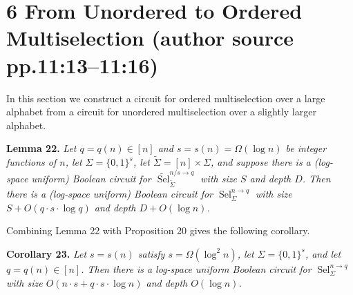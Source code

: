 \documentclass[10pt,a4paper]{article}
\newcommand{\Sel}{\operatorname{Sel}}
\newcommand{\uSel}{\widetilde{\operatorname{Sel}}}
\newcommand{\bits}{\{0,1\}}
\newenvironment{originalresult}[1]{\par\medskip\noindent\textbf{#1.}\itshape}{\par\medskip}
\begin{document}
\section*{6 From Unordered to Ordered Multiselection (author source pp.11:13--11:16)}
In this section we construct a circuit for ordered multiselection over a large alphabet from a circuit for unordered multiselection over a slightly larger alphabet.
\begin{originalresult}{Lemma 22}
Let $q=q(n)\in[n]$ and $s=s(n)=\Omega(\log n)$ be integer functions of $n$, let $\Sigma=\bits^s$, let $\widetilde\Sigma=[n]\times\Sigma$, and suppose there is a (log-space uniform) Boolean circuit for $\uSel_{\widetilde\Sigma}^{n/s\to q}$ with size $S$ and depth $D$.
Then there is a (log-space uniform) Boolean circuit for $\Sel_\Sigma^{n\to q}$ with size $S+O(q\cdot s\cdot\log q)$ and depth $D+O(\log n)$.
\end{originalresult}
Combining Lemma 22 with Proposition 20 gives the following corollary.
\begin{originalresult}{Corollary 23}
Let $s=s(n)$ satisfy $s=\Omega(\log^2n)$, let $\Sigma=\bits^s$, and let $q=q(n)\in[n]$. Then there is a log-space uniform Boolean circuit for $\Sel_\Sigma^{n\to q}$ with size $O(n\cdot s+q\cdot s\cdot\log n)$ and depth $O(\log n)$.
\end{originalresult}
\end{document}
